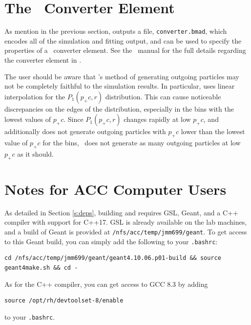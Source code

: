 \documentclass[12pt]{article}
\begin{document}
\section{The \bmad \, Converter Element}

As mention in the previous section, \exef outputs a file, \texttt{converter.bmad}, which encodes all of the simulation and fitting output, and can be used to specify the properties of a \bmad \, converter element.
See the \bmad \, manual for the full details regarding the converter element in \bmad.

The user should be aware that \bmad's method of generating outgoing particles may not be completely faithful to the simulation results.
In particular, \bmad uses linear interpolation for the $P_1(p_+c, r)$ distribution.
This can cause noticeable discrepancies on the edges of the distribution, especially in the bins with the lowest values of $p_+ c$.
Since $P_1(p_+c, r)$ changes rapidly at low $p_+ c$, and \bmad \, additionally does not generate outgoing particles with $p_+ c$ lower than the lowest value of $p_+ c$ for the bins, \bmad \, does not generate as many outgoing particles at low $p_+ c$ as it should.


\appendix

\section{Notes for ACC Computer Users}

As detailed in Section \ref{s:deps}, building \exes and \exef requires GSL, Geant, and a C++ compiler with support for C++17.
GSL is already available on the lab machines, and a build of Geant is provided at \texttt{/nfs/acc/temp/jmm699/geant}.
To get access to this Geant build, you can simply add the following to your \texttt{.bashrc}:
\begin{verbatim}
cd /nfs/acc/temp/jmm699/geant/geant4.10.06.p01-build && source geant4make.sh && cd -
\end{verbatim}
As for the C++ compiler, you can get access to GCC 8.3 by adding
\begin{verbatim}
source /opt/rh/devtoolset-8/enable
\end{verbatim}
to your \texttt{.bashrc}.








\printbibliography
\end{document}
